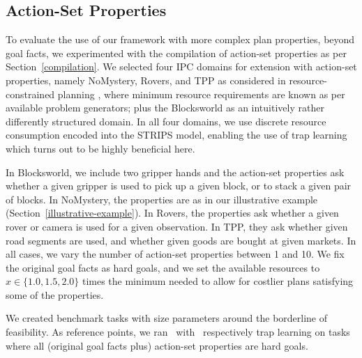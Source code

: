 %








\ifdefined\longflagdefined

\else

\subsection{Action-Set Properties}

To evaluate the use of our framework with more complex plan
properties, beyond goal facts, we experimented with the compilation of
action-set properties as per Section~\ref{compilation}. We selected
four IPC domains for extension with action-set properties, namely
NoMystery, Rovers, and TPP as considered in resource-constrained
planning \cite{nakhost:etal:icaps-12}, where minimum resource
requirements are known as per available problem generators; plus the
Blocksworld as an intuitively rather differently structured domain. In
all four domains, we use discrete resource consumption encoded into
the STRIPS model, enabling the use of trap
learning \cite{steinmetz:hoffmann:ijcai-17} which turns out to be
highly beneficial here.

In Blocksworld, we include two gripper hands and the action-set
properties ask whether a given gripper is used to pick up a given
block, or to stack a given pair of blocks. In NoMystery, the
properties are as in our illustrative example
(Section~\ref{illustrative-example}). In Rovers, the properties ask
whether a given rover or camera is used for a given observation. In
TPP, they ask whether given road segments are used, and whether given
goods are bought at given markets. In all cases, we vary the number of
action-set properties between 1 and 10. We fix the original goal facts
as hard goals, and we set the available resources to $x \in \{1.0,1.5,
2.0\}$ times the minimum needed to allow for costlier plans satisfying
some of the properties.

We created benchmark tasks with size parameters around the borderline
of feasibility. As reference points, we ran \astar\ with \hlmcut\
respectively trap learning on tasks where all (original goal facts
plus) action-set properties are hard goals.


